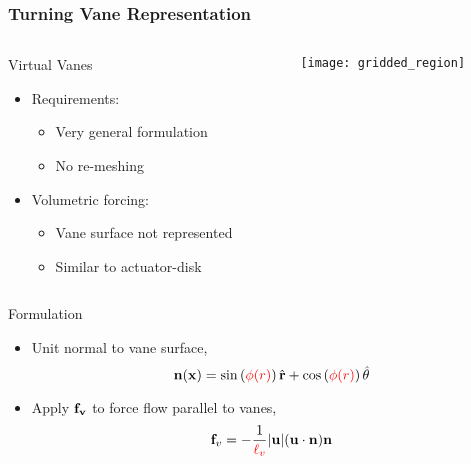 \documentclass[mathserif]{beamer}
\begin{document}
%
%
%
\begin{frame}
\frametitle{Turning Vane Representation}

\begin{columns}[]
  \begin{column}{0.49\linewidth}

   \begin{block}{Virtual Vanes}
    \begin{itemize}
     \item Requirements: 
	   \begin{itemize}
	    \item Very general formulation
	    \item No re-meshing 
	   \end{itemize}
     \item Volumetric forcing: 
	   \begin{itemize}
	    \item Vane surface not represented
	    \item Similar to actuator-disk
	   \end{itemize}	 
    \end{itemize}
   \end{block}
  \end{column}

  \begin{column}{0.49\linewidth}
   \begin{center}
    \texttt{[image: gridded\_region]}
   \end{center}

  \end{column}
\end{columns}

\begin{block}{Formulation}
  \begin{itemize}
    \item Unit normal to vane surface, 
      \begin{equation}
        {\bf n}({\bf x}) = \sin \left(\textcolor{red}{\phi(r)} \right) \hat{{\bf r}}+ \cos
        \left(\textcolor{red}{\phi(r)} \right) \hat{{\bf \theta}} 
      \end{equation}
    \item Apply ${\bf f_v}$ to force flow parallel to vanes,
      \begin{equation}
        {\bf f}_v= -\frac{1}{\textcolor{red}{\ell_v}}|{\bf u}|({\bf u}\cdot{\bf n}){\bf n}
      \end{equation}
  \end{itemize}
\end{block}

\end{frame}
\end{document}
